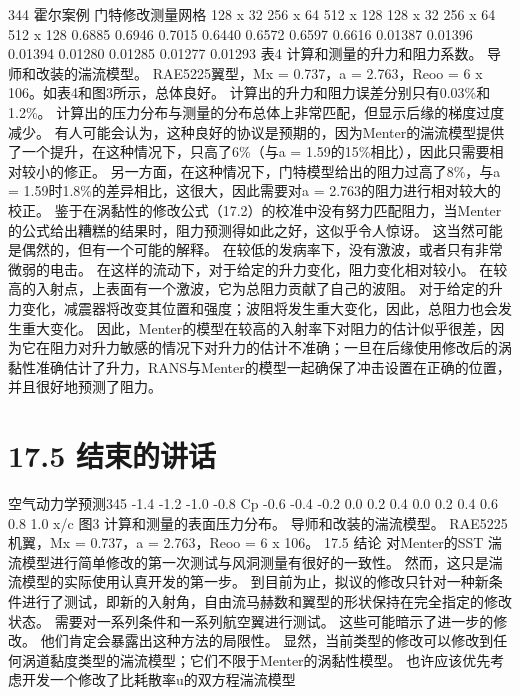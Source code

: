 \documentclass[UTF8,11pt,a4paper,openany,fontset=fandol]{ctexbook}
\begin{document}
344 霍尔案例 门特修改测量网格 128 x 32 256 x 64 512 x 128 128 x 32 256 x 64 512 x 128 0.6885 0.6946 0.7015 0.6440 0.6572 0.6597 0.6616 0.01387 0.01396 0.01394 0.01280 0.01285 0.01277 0.01293 表4 计算和测量的升力和阻力系数。 导师和改装的湍流模型。 RAE5225翼型，Mx = 0.737，a = 2.763，Reoo = 6 x 106。如表4和图3所示，总体良好。 计算出的升力和阻力误差分别只有0.03\%和1.2\%。 计算出的压力分布与测量的分布总体上非常匹配，但显示后缘的梯度过度减少。 有人可能会认为，这种良好的协议是预期的，因为Menter的湍流模型提供了一个提升，在这种情况下，只高了6\%（与a = 1.59的15\%相比），因此只需要相对较小的修正。 另一方面，在这种情况下，门特模型给出的阻力过高了8\%，与a = 1.59时1.8\%的差异相比，这很大，因此需要对a = 2.763的阻力进行相对较大的校正。 鉴于在涡黏性的修改公式（17.2）的校准中没有努力匹配阻力，当Menter的公式给出糟糕的结果时，阻力预测得如此之好，这似乎令人惊讶。 这当然可能是偶然的，但有一个可能的解释。 在较低的发病率下，没有激波，或者只有非常微弱的电击。 在这样的流动下，对于给定的升力变化，阻力变化相对较小。 在较高的入射点，上表面有一个激波，它为总阻力贡献了自己的波阻。 对于给定的升力变化，减震器将改变其位置和强度；波阻将发生重大变化，因此，总阻力也会发生重大变化。 因此，Menter的模型在较高的入射率下对阻力的估计似乎很差，因为它在阻力对升力敏感的情况下对升力的估计不准确；一旦在后缘使用修改后的涡黏性准确估计了升力，RANS与Menter的模型一起确保了冲击设置在正确的位置，并且很好地预测了阻力。

\section{17.5 结束的讲话}
空气动力学预测345 -1.4 -1.2 -1.0 -0.8 Cp -0.6 -0.4 -0.2 0.0 0.2 0.4 0.0 0.2 0.4 0.6 0.8 1.0 x/c 图3 计算和测量的表面压力分布。 导师和改装的湍流模型。 RAE5225机翼，Mx = 0.737，a = 2.763，Reoo = 6 x 106。 17.5 结论 对Menter的SST 湍流模型进行简单修改的第一次测试与风洞测量有很好的一致性。 然而，这只是湍流模型的实际使用认真开发的第一步。 到目前为止，拟议的修改只针对一种新条件进行了测试，即新的入射角，自由流马赫数和翼型的形状保持在完全指定的修改状态。 需要对一系列条件和一系列航空翼进行测试。 这些可能暗示了进一步的修改。 他们肯定会暴露出这种方法的局限性。 显然，当前类型的修改可以修改到任何涡道黏度类型的湍流模型；它们不限于Menter的涡黏性模型。 也许应该优先考虑开发一个修改了比耗散率u的双方程湍流模型
\end{document}

